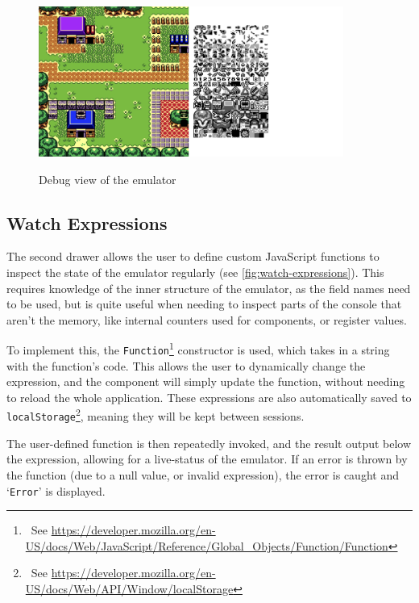 \documentclass[11pt]{informatics-report}
\newcommand{\ftnt}[1]{\footnote{~See \url{#1}}}
\begin{document}
\begin{figure}[h]
    \centering
    \includegraphics[width=10cm]{images/debug-view}\\
    \caption{Debug view of the emulator}
    \label{fig:debug-view}
\end{figure}

\subsection{Watch Expressions}

The second drawer allows the user to define custom JavaScript functions to inspect the state of the emulator regularly (see \ref{fig:watch-expressions}). This requires knowledge of the inner structure of the emulator, as the field names need to be used, but is quite useful when needing to inspect parts of the console that aren't the memory, like internal counters used for components, or register values.

To implement this, the \texttt{Function}\ftnt{https://developer.mozilla.org/en-US/docs/Web/JavaScript/Reference/Global_Objects/Function/Function} constructor is used, which takes in a string with the function's code. This allows the user to dynamically change the expression, and the component will simply update the function, without needing to reload the whole application. These expressions are also automatically saved to \texttt{localStorage}\ftnt{https://developer.mozilla.org/en-US/docs/Web/API/Window/localStorage}, meaning they will be kept between sessions.

The user-defined function is then repeatedly invoked, and the result output below the expression, allowing for a live-status of the emulator. If an error is thrown by the function (due to a null value, or invalid expression), the error is caught and `\texttt{Error}' is displayed.
\end{document}
